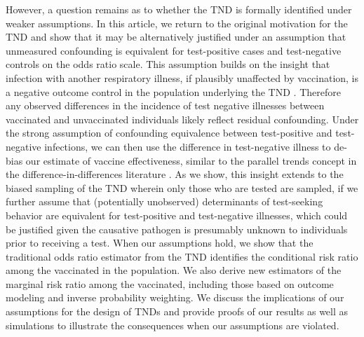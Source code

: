 \documentclass[11pt]{article}
\begin{document}
However, a question remains as to whether the TND is formally identified under weaker assumptions. In this article, we return to the original motivation for the TND and show that it may be alternatively justified under an assumption that unmeasured confounding is equivalent for test-positive cases and test-negative controls on the odds ratio scale. This assumption builds on the insight that infection with another respiratory illness, if plausibly unaffected by vaccination, is a negative outcome control in the population underlying the TND \cite{lipsitch_negative_2010,shi_selective_2020}. Therefore any observed differences in the incidence of test negative illnesses between vaccinated and unvaccinated individuals likely reflect residual confounding. Under the strong assumption of confounding equivalence between test-positive and test-negative infections, we can then use the difference in test-negative illness to de-bias our estimate of vaccine effectiveness, similar to the parallel trends concept in the difference-in-differences literature \cite{sofer_negative_2016,park_universal_2023,tchetgen_universal_2023}. As we show, this insight extends to the biased sampling of the TND wherein only those who are tested are sampled, if we further assume that (potentially unobserved) determinants of test-seeking behavior are equivalent for test-positive and test-negative illnesses, which could be justified given the causative pathogen is presumably unknown to individuals prior to receiving a test. When our assumptions hold, we show that the traditional odds ratio estimator from the TND identifies the conditional risk ratio among the vaccinated in the population. We also derive new estimators of the marginal risk ratio among the vaccinated, including those based on outcome modeling and inverse probability weighting. We discuss the implications of our assumptions for the design of TNDs and provide proofs of our results as well as simulations to illustrate the consequences when our assumptions are violated.
\end{document}
